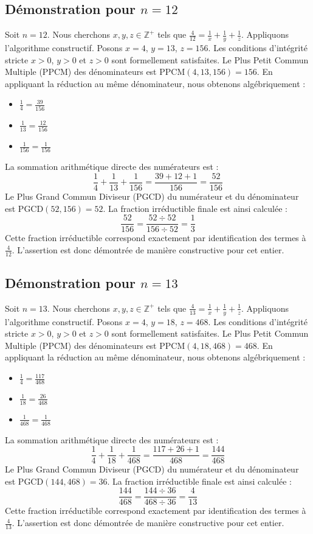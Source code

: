 \documentclass[11pt,a4paper]{article}
\begin{document}
\subsection{Démonstration pour $n = 12$}
Soit $n = 12$. Nous cherchons $x, y, z \in \mathbb{Z}^{+}$ tels que $\frac{4}{12} = \frac{1}{x} + \frac{1}{y} + \frac{1}{z}$.
Appliquons l'algorithme constructif. Posons $x = 4$, $y = 13$, $z = 156$.
Les conditions d'intégrité stricte $x > 0$, $y > 0$ et $z > 0$ sont formellement satisfaites.
Le Plus Petit Commun Multiple (PPCM) des dénominateurs est $\text{PPCM}(4, 13, 156) = 156$.
En appliquant la réduction au même dénominateur, nous obtenons algébriquement :
\begin{itemize}
    \item $\frac{1}{4} = \frac{39}{156}$
    \item $\frac{1}{13} = \frac{12}{156}$
    \item $\frac{1}{156} = \frac{1}{156}$
\end{itemize}
La sommation arithmétique directe des numérateurs est :
$$ \frac{1}{4} + \frac{1}{13} + \frac{1}{156} = \frac{39 + 12 + 1}{156} = \frac{52}{156} $$
Le Plus Grand Commun Diviseur (PGCD) du numérateur et du dénominateur est $\text{PGCD}(52, 156) = 52$.
La fraction irréductible finale est ainsi calculée :
$$ \frac{52}{156} = \frac{52 \div 52}{156 \div 52} = \frac{1}{3} $$
Cette fraction irréductible correspond exactement par identification des termes à $\frac{4}{12}$. L'assertion est donc démontrée de manière constructive pour cet entier.

\subsection{Démonstration pour $n = 13$}
Soit $n = 13$. Nous cherchons $x, y, z \in \mathbb{Z}^{+}$ tels que $\frac{4}{13} = \frac{1}{x} + \frac{1}{y} + \frac{1}{z}$.
Appliquons l'algorithme constructif. Posons $x = 4$, $y = 18$, $z = 468$.
Les conditions d'intégrité stricte $x > 0$, $y > 0$ et $z > 0$ sont formellement satisfaites.
Le Plus Petit Commun Multiple (PPCM) des dénominateurs est $\text{PPCM}(4, 18, 468) = 468$.
En appliquant la réduction au même dénominateur, nous obtenons algébriquement :
\begin{itemize}
    \item $\frac{1}{4} = \frac{117}{468}$
    \item $\frac{1}{18} = \frac{26}{468}$
    \item $\frac{1}{468} = \frac{1}{468}$
\end{itemize}
La sommation arithmétique directe des numérateurs est :
$$ \frac{1}{4} + \frac{1}{18} + \frac{1}{468} = \frac{117 + 26 + 1}{468} = \frac{144}{468} $$
Le Plus Grand Commun Diviseur (PGCD) du numérateur et du dénominateur est $\text{PGCD}(144, 468) = 36$.
La fraction irréductible finale est ainsi calculée :
$$ \frac{144}{468} = \frac{144 \div 36}{468 \div 36} = \frac{4}{13} $$
Cette fraction irréductible correspond exactement par identification des termes à $\frac{4}{13}$. L'assertion est donc démontrée de manière constructive pour cet entier.
\end{document}
